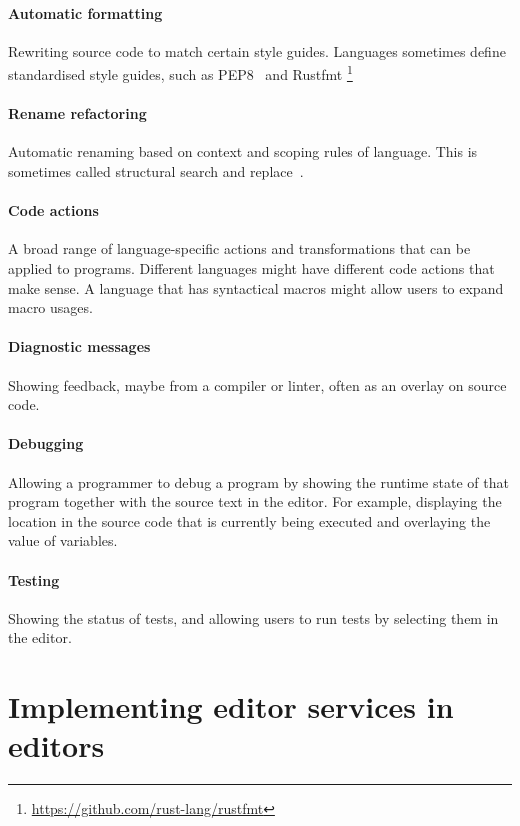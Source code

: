 \paragraph{Automatic formatting}
Rewriting source code to match certain style guides.
Languages sometimes define standardised style guides, such as PEP8~\autocite*{pep8} and Rustfmt \footnote{\url{https://github.com/rust-lang/rustfmt}}

\paragraph{Rename refactoring}
Automatic renaming based on context and scoping rules of language.
This is sometimes called structural search and replace~\autocite{jetbrains_ssr}.

\paragraph{Code actions}
A broad range of language-specific actions and transformations that can be applied to programs.
Different languages might have different code actions that make sense.
A language that has syntactical macros might allow users to expand macro usages.

\paragraph{Diagnostic messages}
Showing feedback, maybe from a compiler or linter, often as an overlay on source code.

\paragraph{Debugging}
Allowing a programmer to debug a program by showing the runtime state of that program together with the source text in the editor.
For example, displaying the location in the source code that is currently being executed and overlaying the value of variables.

\paragraph{Testing}
Showing the status of tests, and allowing users to run tests by selecting them in the editor.

\section{Implementing editor services in editors}\label{sec:implementing-editor-services-in-editors}

